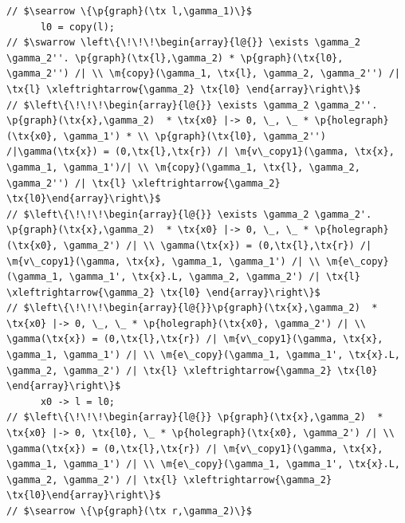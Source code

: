 \documentclass[acmsmall,screen]{acmart}  %
\newcommand{\tx}[1]{\text{#1}}
\newcommand{\p}[1]{\ensuremath{\mathsf{#1}}} \newcommand{\m}[1]{\ensuremath{\mathit{#1}}} \newcommand{\ma}[1]{\ensuremath{\mathcal{#1}}} \let\ramify\lightning
\begin{document}
\begin{lstlisting}
// $\searrow \{\p{graph}(\tx l,\gamma_1)\}$
      l0 = copy(l);
// $\swarrow \left\{\!\!\!\begin{array}{l@{}} \exists \gamma_2 \gamma_2''. \p{graph}(\tx{l},\gamma_2) * \p{graph}(\tx{l0}, \gamma_2'') /| \\ \m{copy}(\gamma_1, \tx{l}, \gamma_2, \gamma_2'') /| \tx{l} \xleftrightarrow{\gamma_2} \tx{l0} \end{array}\right\}$
// $\left\{\!\!\!\begin{array}{l@{}} \exists \gamma_2 \gamma_2''. \p{graph}(\tx{x},\gamma_2)  * \tx{x0} |-> 0, \_, \_ * \p{holegraph}(\tx{x0}, \gamma_1') * \\ \p{graph}(\tx{l0}, \gamma_2'') /|\gamma(\tx{x}) = (0,\tx{l},\tx{r}) /| \m{v\_copy1}(\gamma, \tx{x}, \gamma_1, \gamma_1')/| \\ \m{copy}(\gamma_1, \tx{l}, \gamma_2, \gamma_2'') /| \tx{l} \xleftrightarrow{\gamma_2} \tx{l0}\end{array}\right\}$
// $\left\{\!\!\!\begin{array}{l@{}} \exists \gamma_2 \gamma_2'. \p{graph}(\tx{x},\gamma_2)  * \tx{x0} |-> 0, \_, \_ * \p{holegraph}(\tx{x0}, \gamma_2') /| \\ \gamma(\tx{x}) = (0,\tx{l},\tx{r}) /| \m{v\_copy1}(\gamma, \tx{x}, \gamma_1, \gamma_1') /| \\ \m{e\_copy}(\gamma_1, \gamma_1', \tx{x}.L, \gamma_2, \gamma_2') /| \tx{l} \xleftrightarrow{\gamma_2} \tx{l0} \end{array}\right\}$
// $\left\{\!\!\!\begin{array}{l@{}}\p{graph}(\tx{x},\gamma_2)  * \tx{x0} |-> 0, \_, \_ * \p{holegraph}(\tx{x0}, \gamma_2') /| \\ \gamma(\tx{x}) = (0,\tx{l},\tx{r}) /| \m{v\_copy1}(\gamma, \tx{x}, \gamma_1, \gamma_1') /| \\ \m{e\_copy}(\gamma_1, \gamma_1', \tx{x}.L, \gamma_2, \gamma_2') /| \tx{l} \xleftrightarrow{\gamma_2} \tx{l0} \end{array}\right\}$
      x0 -> l = l0;
// $\left\{\!\!\!\begin{array}{l@{}} \p{graph}(\tx{x},\gamma_2)  * \tx{x0} |-> 0, \tx{l0}, \_ * \p{holegraph}(\tx{x0}, \gamma_2') /| \\ \gamma(\tx{x}) = (0,\tx{l},\tx{r}) /| \m{v\_copy1}(\gamma, \tx{x}, \gamma_1, \gamma_1') /| \\ \m{e\_copy}(\gamma_1, \gamma_1', \tx{x}.L, \gamma_2, \gamma_2') /| \tx{l} \xleftrightarrow{\gamma_2} \tx{l0}\end{array}\right\}$
// $\searrow \{\p{graph}(\tx r,\gamma_2)\}$

\end{lstlisting}
\end{document}
